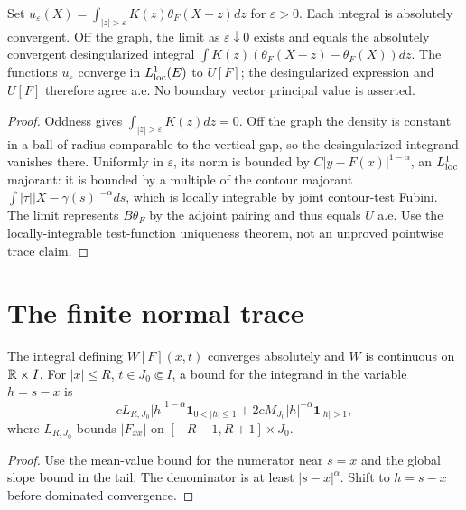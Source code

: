 \begin{lemma}
  \label{lem:c13_bulk_principal_value}
  Set $u_\varepsilon(X)=\int_{|z|>\varepsilon}K(z)\theta_F(X-z)dz$ for $\varepsilon>0$.
  Each integral is absolutely convergent. Off the graph, the limit as $\varepsilon\downarrow0$
  exists and equals the absolutely convergent desingularized integral
  $\int K(z)(\theta_F(X-z)-\theta_F(X))dz$.
  The functions $u_\varepsilon$ converge in $L^1_{\rm loc}(E)$ to $U[F]$; the desingularized
  expression and $U[F]$ therefore agree a.e. No boundary vector principal value is asserted.
\end{lemma}
\begin{proof}
  Oddness gives $\int_{|z|>\varepsilon}K(z)dz=0$. Off the graph the density is constant in a ball
  of radius comparable to the vertical gap, so the desingularized integrand vanishes there.
  Uniformly in $\varepsilon$, its norm is bounded by $C|y-F(x)|^{1-\alpha}$, an $L^1_{\rm loc}$
  majorant: it is bounded by a multiple of the contour majorant $\int|\tau||X-\gamma(s)|^{-\alpha}ds$,
  which is locally integrable by joint contour-test Fubini. The limit represents $B\theta_F$ by the adjoint pairing and thus equals $U$ a.e.
  Use the locally-integrable test-function uniqueness theorem, not an unproved pointwise trace claim.
\end{proof}

\section{The finite normal trace}

\begin{lemma}
  \label{lem:c13_normal_speed_integrable}
  The integral defining $W[F](x,t)$ converges absolutely and $W$ is continuous on $\mathbb{R}\times I$.
  For $|x|\le R$, $t\in J_0\Subset I$, a bound for the integrand in the variable $h=s-x$ is
  \[
    c L_{R,J_0}|h|^{1-\alpha}\mathbf1_{0<|h|\le1}
      +2c M_{J_0}|h|^{-\alpha}\mathbf1_{|h|>1},
  \]
  where $L_{R,J_0}$ bounds $|F_{xx}|$ on $[-R-1,R+1]\times J_0$.
\end{lemma}
\begin{proof}
  Use the mean-value bound for the numerator near $s=x$ and the global slope bound in the tail.
  The denominator is at least $|s-x|^\alpha$. Shift to $h=s-x$ before dominated convergence.
\end{proof}

